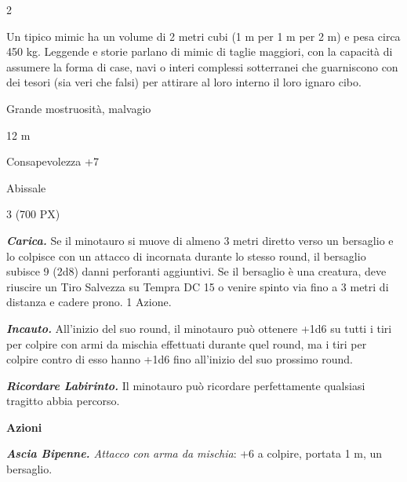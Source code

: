 \begin{multicols}{2}
{Un tipico mimic ha un volume di 2 metri cubi (1 m per 1 m per 2 m) e pesa circa 450 kg. Leggende e storie parlano di mimic di taglie maggiori, con la capacità di assumere la forma di case, navi o interi complessi sotterranei che guarniscono con dei tesori (sia veri che falsi) per attirare al loro interno il loro ignaro cibo.

\begin{description}[noitemsep, topsep=0pt, parsep=0pt, partopsep=0pt, itemsep=1pt, leftmargin=2.35cm,  labelwidth=2.2cm, itemindent=0cm, listparindent=0pt] %
\setlength{\baselineskip}{10pt}
\item[\textbf{Taglia/Tipo}] Grande mostruosità, malvagio
\item[\textbf{Caratt.}] 
\item[\textbf{Punti Ferita}] 
\item[\textbf{Movimento}] 12 m
\item[\textbf{Tiri Salvez.}] 
\item[\textbf{Comp.}] Consapevolezza +7
\item[\textbf{Sensi}] 
\item[\textbf{Linguaggi}] Abissale
\item[\textbf{Sfida}] 3 (700 PX)
\end{description}
\smallskip

\emph{\textbf{Carica.}} Se il minotauro si muove di almeno 3 metri diretto verso un bersaglio e lo colpisce con un attacco di incornata durante lo stesso round, il bersaglio subisce 9 (2d8) danni perforanti aggiuntivi. Se il bersaglio è una creatura, deve riuscire un Tiro Salvezza su Tempra DC 15 o venire spinto via fino a 3 metri di distanza e cadere prono. 1 Azione.

\emph{\textbf{Incauto.}} All'inizio del suo round, il minotauro può ottenere +1d6 su tutti i tiri per colpire con armi da mischia effettuati durante quel round, ma i tiri per colpire contro di esso hanno +1d6 fino all'inizio del suo prossimo round.

\emph{\textbf{Ricordare Labirinto.}} Il minotauro può ricordare perfettamente qualsiasi tragitto abbia percorso.

\textbf{Azioni}

\emph{\textbf{Ascia Bipenne.} Attacco con arma da mischia}: +6 a colpire, portata 1 m, un bersaglio.

}
\end{multicols}

